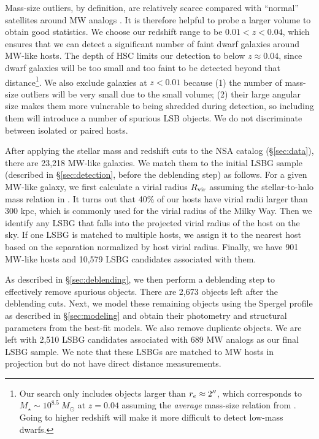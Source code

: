 \documentclass[twocolumn,astrosymb,twocolappendix]{aastex631}
\begin{document}
\begin{CJK*}{UTF8}{gbsn}
Mass-size outliers, by definition, are relatively scarce compared with ``normal'' satellites around MW analogs \citep{SAGA-II,CarlstenELVES2022}. It is therefore helpful to probe a larger volume to obtain good statistics. We choose our redshift range to be $0.01 < z < 0.04$, which ensures that we can detect a significant number of faint dwarf galaxies around MW-like hosts. The depth of HSC limits our detection to below $z \approx 0.04$, since dwarf galaxies will be too small and too faint to be detected beyond that distance\footnote{Our search only includes objects larger than $r_e\approx 2\mbox{$^{\prime\prime}$}$, which corresponds to $M_\star \sim 10^{8.5}\ M_\odot$ at $z=0.04$ assuming the \textit{average} mass-size relation from \citet{ELVES-I}. Going to higher redshift will make it more difficult to detect low-mass dwarfs.}. We also exclude galaxies at $z<0.01$ because (1) the number of mass-size outliers will be very small due to the small volume; (2) their large angular size makes them more vulnerable to being shredded during detection, so including them will introduce a number of spurious LSB objects. We do not discriminate between isolated or paired hosts.

After applying the stellar mass and redshift cuts to the NSA catalog (\S\ref{sec:data}), there are 23,218 MW-like galaxies. We match them to the initial LSBG sample (described in \S \ref{sec:detection}, before the deblending step) as follows. For a given MW-like galaxy, we first calculate a virial radius $R_{\rm vir}$ assuming the stellar-to-halo mass relation in \citet{Behroozi2010}. It turns out that 40\% of our hosts have virial radii larger than 300 kpc, which is commonly used for the virial radius of the Milky Way. Then we identify any LSBG that falls into the projected virial radius of the host on the sky. If one LSBG is matched to multiple hosts, we assign it to the nearest host based on the separation normalized by host virial radius. Finally, we have 901 MW-like hosts and 10,579 LSBG candidates associated with them. 

As described in \S\ref{sec:deblending}, we then perform a deblending step to effectively remove spurious objects. There are 2,673 objects left after the deblending cuts. Next, we model these remaining objects using the Spergel profile as described in \S\ref{sec:modeling} and obtain their photometry and structural parameters from the best-fit models. 
We also remove duplicate objects. We are left with 2,510 LSBG candidates associated with 689 MW analogs as our final LSBG sample. We note that these LSBGs are matched to MW hosts in projection but do not have direct distance measurements. 



\end{CJK*}
\end{document}
